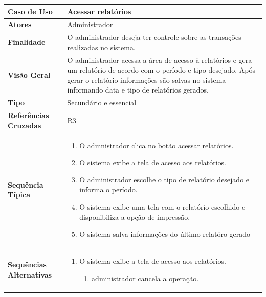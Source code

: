 \documentclass[a4paper,11pt]{article}
\begin{document}
\begin{table}[H]
		\begin{tabularx}{\textwidth}{|l|X|}
		\hline
			\textbf{Caso de Uso} &  Acessar relatórios \\ \hline
			\textbf{Atores} &  Administrador  \\ \hline
			\textbf{Finalidade} & O administrador deseja ter controle sobre as transações realizadas no sistema.  \\ \hline
			\textbf{Visão Geral} & O administrador acessa a área de acesso à relatórios e gera um relatório de acordo com o período e tipo desejado. Após gerar o relatório informações são salvas no sistema informando data e tipo de relatórios gerados.  \\ \hline
			\textbf{Tipo} & Secundário e essencial \\ \hline
			\textbf{Referências Cruzadas} & R3  \\ \hline
			\textbf{Sequência Típica} & 
			\begin{enumerate}
			\item O admnistrador clica no botão acessar relatórios.
			\item O sistema exibe a tela de acesso aos relatórios.
			\item O administrador escolhe o tipo de relatório desejado e informa o período.
			\item O sistema exibe uma tela com o relatório escolhido e disponibiliza a opção de impressão.
			\item O sistema salva informações do último relatóro gerado
			\end{enumerate} \\ \hline
			\textbf{Sequências Alternativas} & 
			\begin{enumerate}
			\item O sistema exibe a tela de acesso aos relatórios.
			\begin{enumerate}
			\item administrador cancela a operação.
			\end{enumerate}
			\end{enumerate} \\ \hline
		\end{tabularx}
\end{table}
\end{document}
